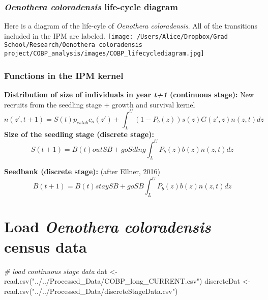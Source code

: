 \documentclass[
]{article}
\newenvironment{Shaded}{\begin{snugshade}}{\end{snugshade}}
\newcommand{\CommentTok}[1]{\textcolor[rgb]{0.56,0.35,0.01}{\textit{#1}}}
\newcommand{\FunctionTok}[1]{\textcolor[rgb]{0.00,0.00,0.00}{#1}}
\newcommand{\NormalTok}[1]{#1}
\newcommand{\OtherTok}[1]{\textcolor[rgb]{0.56,0.35,0.01}{#1}}
\newcommand{\StringTok}[1]{\textcolor[rgb]{0.31,0.60,0.02}{#1}}
\begin{document}
\hypertarget{oenothera-coloradensis-life-cycle-diagram}{%
\subsubsection{\texorpdfstring{\emph{Oenothera coloradensis} life-cycle
diagram}{Oenothera coloradensis life-cycle diagram}}\label{oenothera-coloradensis-life-cycle-diagram}}

Here is a diagram of the life-cyle of \emph{Oenothera coloradensis}. All
of the transitions included in the IPM are labeled.
\texttt{[image: /Users/Alice/Dropbox/Grad School/Research/Oenothera coloradensis project/COBP\_analysis/images/COBP\_lifecyclediagram.jpg]}

\hypertarget{functions-in-the-ipm-kernel}{%
\subsubsection{Functions in the IPM
kernel}\label{functions-in-the-ipm-kernel}}

\textbf{Distribution of size of individuals in year \emph{t+1}
(continuous stage):} New recruits from the seedling stage + growth and
survival kernel
\[n(z',t+1) = S(t)p_{estab}c_o(z') + \int_{L}^{U}(1-P_b(z))s(z)G(z',z)n(z,t)dz \]
\textbf{Size of the seedling stage (discrete stage):}
\[S(t+1) = B(t)outSB + goSdlng\int_{L}^{U}P_b(z)b(z)n(z,t)dz \]

\textbf{Seedbank (discrete stage):} (after Ellner, 2016)
\[B(t+1) = B(t)staySB+goSB\int_{L}^{U}P_b(z)b(z)n(z,t)dz \]

\hypertarget{load-oenothera-coloradensis-census-data}{%
\section{\texorpdfstring{Load \emph{Oenothera coloradensis} census
data}{Load Oenothera coloradensis census data}}\label{load-oenothera-coloradensis-census-data}}

\begin{Shaded}
\begin{Highlighting}[]
\CommentTok{\# load continuous stage data}
\NormalTok{dat }\OtherTok{\textless{}{-}} \FunctionTok{read.csv}\NormalTok{(}\StringTok{"../../Processed\_Data/COBP\_long\_CURRENT.csv"}\NormalTok{)}
\NormalTok{discreteDat }\OtherTok{\textless{}{-}} \FunctionTok{read.csv}\NormalTok{(}\StringTok{"../../Processed\_Data/discreteStageData.csv"}\NormalTok{)}
\end{Highlighting}
\end{Shaded}
\end{document}
